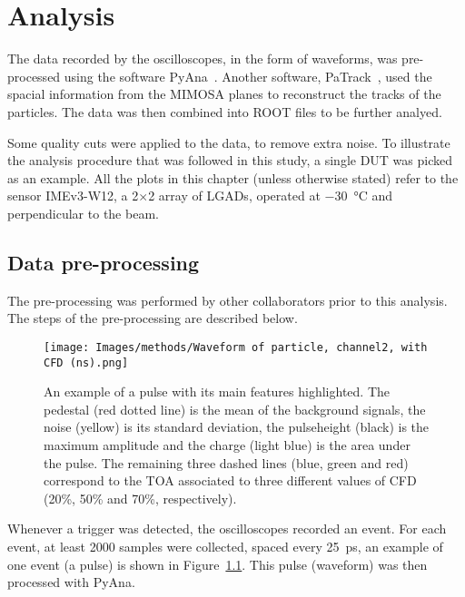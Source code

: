 \chapter{Analysis}\label{chap:methods}

The data recorded by the oscilloscopes, in the form of waveforms, was pre-processed using the software PyAna~\cite{atlas_hgtd_pyana_2025}. Another software, PaTrack~\cite{atlas_hgtd_patrack_2025}, used the spacial information from the MIMOSA planes to reconstruct the tracks of the particles. The data was then combined into ROOT files to be further analyed.

Some quality cuts were applied to the data, to remove extra noise. To illustrate the analysis procedure that was followed in this study, a single DUT was picked as an example. All the plots in this chapter (unless otherwise stated) refer to the sensor IMEv3-W12, a 2\(\times\)2 array of LGADs, operated at \qty{-30}{\degreeCelsius} and perpendicular to the beam.

\section{Data pre-processing}

The pre-processing was performed by other collaborators prior to this analysis. The steps of the pre-processing are described below.

\begin{figure}[h!btp]
    \centering
    \texttt{[image: Images/methods/Waveform of particle, channel2, with CFD (ns).png]}
    \captionsetup{width=\captionwidth}
    \caption{An example of a pulse with its main features highlighted. The pedestal (red dotted line) is the mean of the background signals, the noise (yellow) is its standard deviation, the pulseheight (black) is the maximum amplitude and the charge (light blue) is the area under the pulse. The remaining three dashed lines (blue, green and red) correspond to the TOA associated to three different values of CFD (20\%, 50\% and 70\%, respectively).}
    \label{fig:waveform_features}
\end{figure} 

Whenever a trigger was detected, the oscilloscopes recorded an event. For each event, at least 2000 samples were collected, spaced every \qty{25}{\pico\second}, an example of one event (a pulse) is shown in Figure~\ref{fig:waveform_features}. This pulse (waveform) was then processed with PyAna.

